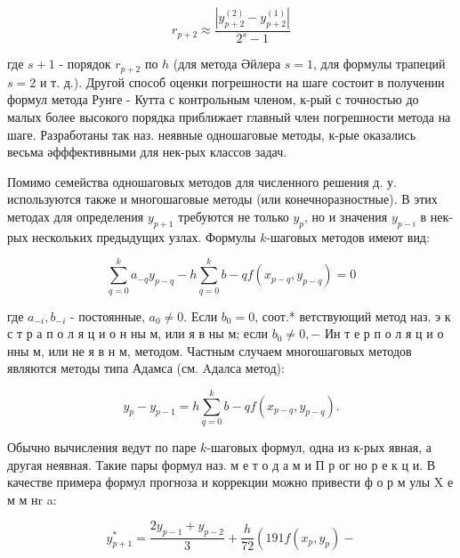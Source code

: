 \documentclass[10pt]{article}
\begin{document}
\[

r_{p+2} \approx \frac{\left|y_{p+2}^{(2)}-y_{p+2}^{(1)}\right|}{2^{s}-1}

\]



где $s+1$ - порядок $r_{p+2}$ по $h$ (для метода Әйлера $s=1$, для формулы трапеций $s=2$ и т. д.). Другой способ оценки погрешности на шаге состоит в получении формул метода Рунге - Кутта с контрольным членом, к-рый с точностью до малых более высокого порядка приближает главный член погрешности метода на шаге. Разработаны так наз. неявные одношаговые методы, к-рые оказались весьма әфффективными для нек-рых классов задач.



Помимо семейства одношаговых методов для численного решения д. у. используются также и многошаговые методы (или конечноразностные). В этих методах для определения $y_{p+1}$ требуются не только $y_{p}$, но и значения $y_{p-i}$ в нек-рых нескольких предыдущих узлах. Формулы $k$-шаговых методов имеют вид:



\[

\sum_{q=0}^{k} a_{-q} y_{p-q}-h \sum_{q=0}^{k} b-q f\left(x_{p-q}, y_{p-q}\right)=0

\]



где $a_{-i}, b_{-i}$ - постоянные, $a_{0} \neq 0$. Если $b_{0}=0$, соот.* ветствующий метод наз. э к с т р а п о л я ц и о н ны м, или я в ны м; если $b_{0} \neq 0,-$ Ин т е р п о л я ц и о нны м, или не я в н м, методом. Частным случаем многошаговых методов являются методы типа Адамса (см. Aдалса метод):



\[

y_{p}-y_{p-1}=h \sum_{q=0}^{k} b-q f\left(x_{p-q}, y_{p-q}\right) .

\]



Обычно вычисления ведут по паре $k$-шаговых формул, одна из к-рых явная, а другая неявная. Такие пары формул наз. м е т о д а м и П р ог но р е к ц и. В качестве примера формул прогноза и коррекции можно привести ф о р м улы $\mathrm{X}$ е м м нr a:



\[

y_{p+1}^{*}=\frac{2 y_{p-1}+y_{p-2}}{3}+\frac{h}{72}\left(191 f\left(x_{p}, y_{p}\right)-\right.

\]
\end{document}

